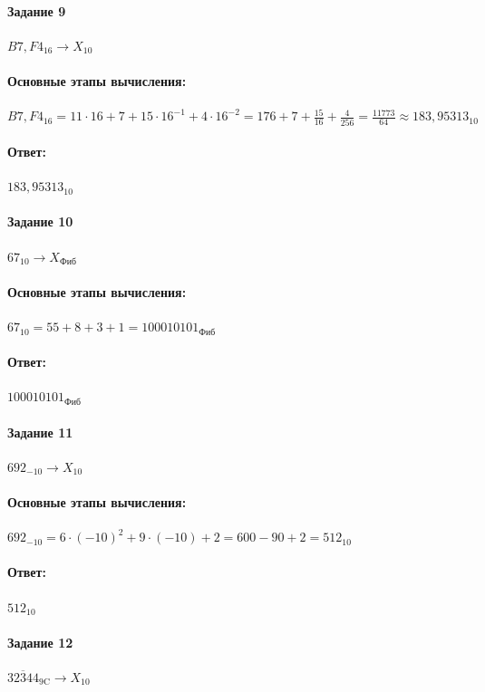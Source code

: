 \documentclass[12pt,onecolumn]{article}
\begin{document}
\paragraph{Задание 9}
$B7,F4_{16} \rightarrow X_{10}$

\paragraph{Основные этапы вычисления:}
\hfill \break
$B7,F4_{16} = 11\cdot16+7+15\cdot16^{-1}+4\cdot16^{-2} = 176+7+\frac{15}{16}+\frac{4}{256} =\frac{11773}{64} \approx 183,95313_{10}$
\paragraph{Ответ:}
$183,95313_{10}$

\paragraph{Задание 10}
$67_{10} \rightarrow X_\text{Фиб}$

\paragraph{Основные этапы вычисления:}
\hfill \break

$67_{10} = 55 + 8 + 3 + 1 = 100010101_\text{Фиб}$

\paragraph{Ответ:}
$100010101_\text{Фиб}$

\paragraph{Задание 11}
$692_{-10} \rightarrow X_{10}$

\paragraph{Основные этапы вычисления:}
\hfill \break

$692_{-10} = 6\cdot(-10)^{2}+9\cdot(-10)+2 = 600 - 90 + 2 = 512_{10}$

\paragraph{Ответ:}
$512_{10}$

\paragraph{Задание 12}
$32\overline{3}44_\text{9C} \rightarrow X_{10}$
\end{document}
